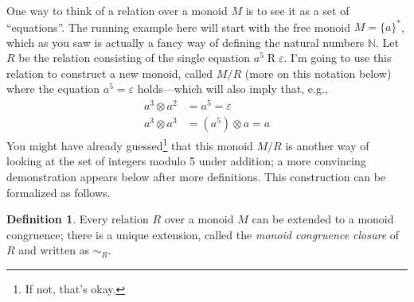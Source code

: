 \documentclass[a4paper,headsepline,bibliography=totoc,toc=flat,fleqn,twoside=semi]{scrbook}
\theoremstyle{definition}
\newtheorem{definition}{Definition}[chapter]
\theoremstyle{definition}
\theoremstyle{definition}
\begin{document}
One way to think of a relation over a monoid $M$ is to see it as a set of ``equations''. The running example here will start with the free monoid $M=\{a\}^*$, which as you saw is actually a fancy way of defining the natural numbers $\mathbb{N}$. Let $R$ be the relation consisting of the single equation $a^5\mathrel{R}\varepsilon$. I'm going to use this relation to construct a new monoid, called $M/R$ (more on this notation below) where the equation $a^5=\varepsilon$ holds---which will also imply that, e.g.,
\begin{align*}
a^3\otimes a^2&=a^5=\varepsilon\\
a^3\otimes a^3&=(a^5)\otimes a=a
\end{align*}
You might have already guessed\footnote{If not, that's okay.} that this monoid $M/R$ is another way of looking at the set of integers modulo 5 under addition; a more convincing demonstration appears below after more definitions. This construction can be formalized as follows.

\begin{definition}
Every relation $R$ over a monoid $M$ can be extended to a monoid congruence; there is a unique extension, called the \emph{monoid congruence closure} of $R$ and written as $\sim_R$.
\end{definition}
\end{document}
